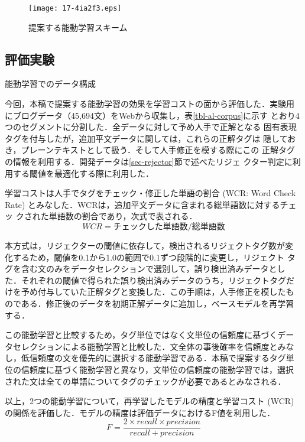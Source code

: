 \documentclass[japanese]{jnlp_1.4}
\begin{document}
\begin{figure}[b]
\begin{center}
\texttt{[image: 17-4ia2f3.eps]}
\end{center}
\caption{提案する能動学習スキーム}
\label{fig-active-learning}
\end{figure}


\subsection{評価実験}

\begin{table}[b]
\caption{能動学習でのデータ構成}
\label{tbl-al-corpus}

\end{table}

今回，本稿で提案する能動学習の効果を学習コストの面から評価した．実験用
にブログデータ（45,694文）をWebから収集し，表\ref{tbl-al-corpus}に示す
とおり4つのセグメントに分割した．全データに対して予め人手で正解となる
固有表現タグを付与したが，追加平文データに関しては，これらの正解タグは
隠しておき，プレーンテキストとして扱う．そして人手修正を模する際にこの
正解タグの情報を利用する．開発データは\ref{sec-rejector}節で述べたリジェ
クター判定に利用する閾値を最適化する際に利用した．

学習コストは人手でタグをチェック・修正した単語の割合 (WCR: Word Check
Rate) とみなした．WCRは，追加平文データに含まれる総単語数に対するチェッ
クされた単語数の割合であり，次式で表される．
\begin{displaymath}
WCR = チェックした単語数 / 総単語数
\end{displaymath}

本方式は，リジェクターの閾値に依存して，検出されるリジェクトタグ数が変
化するため，閾値を0.1から1.0の範囲で0.1ずつ段階的に変更し，リジェクト
タグを含む文のみをデータセレクションで選別して，誤り検出済みデータとし
た．それぞれの閾値で得られた誤り検出済みデータのうち，リジェクトタグだ
けを予め付与していた正解タグと変換した．この手順は，人手修正を模したも
のである．修正後のデータを初期正解データに追加し，ベースモデルを再学習
する．

この能動学習と比較するため，タグ単位ではなく文単位の信頼度に基づくデー
タセレクションによる能動学習と比較した．文全体の事後確率を信頼度とみな
し，低信頼度の文を優先的に選択する能動学習である．本稿で提案するタグ単
位の信頼度に基づく能動学習と異なり，文単位の信頼度の能動学習では，選択
された文は全ての単語についてタグのチェックが必要であるとみなされる．

以上，2つの能動学習について，再学習したモデルの精度と学習コスト (WCR) 
の関係を評価した．モデルの精度は評価データにおけるF値を利用した．
\begin{equation}
F  =  \frac{2 \times recall \times precision}{recall + precision}
\end{equation}
\end{document}
